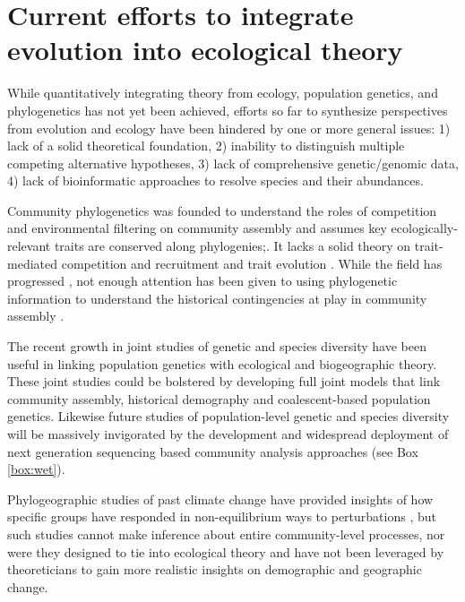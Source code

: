 \documentclass[12pt]{article}
\newcounter{Box}
\begin{document}
\section{Current efforts to integrate evolution into ecological theory} \label{sec:toDate}

While quantitatively integrating theory from ecology, population
genetics, and phylogenetics has not yet been achieved, efforts so far
to synthesize perspectives from evolution and ecology have been hindered by one or more general issues:
1) lack of a solid theoretical foundation, 2) inability to distinguish
multiple competing alternative hypotheses, 3) lack of comprehensive
genetic/genomic data, 4) lack of bioinformatic approaches to resolve species
and their abundances. 

Community phylogenetics \citep{Webb2002-yr} was founded to understand
the roles of competition and environmental filtering on community
assembly and  assumes key ecologically-relevant traits are conserved
along phylogenies;. It lacks a solid theory on trait-mediated
competition and recruitment and trait evolution \citep{Losos2008-eq}. While the field has
progressed \citep[e.g.,][]{sukumaran2016}, not enough attention has been
given to using phylogenetic information to understand the historical
contingencies at play in community assembly \citep{Ricklefs2007-wo,
  Emerson2008-as}.

The recent growth in joint studies of genetic and species diversity
\citep{Vanoverbeke2015-ym, Vellend2005-up, Vellend2014-ir,
  Papadopoulou2011-bd} have been useful in linking population genetics
with ecological and biogeographic theory. These joint studies could be bolstered by
developing full joint models that link community assembly, historical
demography and coalescent-based population genetics. Likewise future
studies of population-level genetic and species diversity will be
massively invigorated by the development and widespread deployment of
next generation sequencing based community analysis approaches (see
Box \ref{box:wet}).

Phylogeographic studies of past climate change have provided insights
of how specific groups have responded in non-equilibrium ways to
perturbations \citep{Arbogast2001-jx, Smith2012-db, Hickerson2005-ek,
  Satler2016-lb}, but such studies cannot make inference about entire
community-level processes, nor were they designed to tie into
ecological theory and have not been leveraged by theoreticians to gain
more realistic insights on demographic and geographic change.
\end{document}
